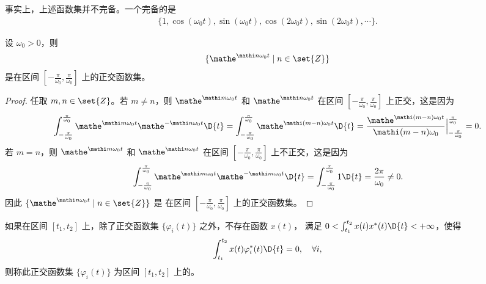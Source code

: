 \begin{note}
    事实上，上述函数集并不完备。一个完备的是
    \begin{align*}
        \{1, \cos(\omega_0t), \sin(\omega_0t), \cos(2\omega_0t), \sin(2\omega_0t), \cdots\}.
    \end{align*}
\end{note}

\begin{example}[指数函数集]
    设 $\omega_0 > 0$，则
    \begin{align*}
        \{\mathe^{\mathi n\omega_0t} \mid n \in \set{Z}\}
    \end{align*}
    是在区间 $[-\frac{\pi}{\omega_0}, \frac{\pi}{\omega_0}]$ 上的正交函数集。
\end{example}

\begin{proof}
    任取 $m, n \in \set{Z}$。若 $m \neq n$，则 $\mathe^{\mathi m\omega_0t}$ 和 $\mathe^{\mathi n\omega_0t}$
    在区间 $[-\frac{\pi}{\omega_0}, \frac{\pi}{\omega_0}]$ 上正交，这是因为
    \begin{align*}
        \int_{-\frac{\pi}{\omega_0}}^{\frac{\pi}{\omega_0}}\mathe^{\mathi m\omega_0t}\mathe^{-\mathi n\omega_0t}\D{t}
        = \int_{-\frac{\pi}{\omega_0}}^{\frac{\pi}{\omega_0}}\mathe^{\mathi (m - n)\omega_0t}\D{t}
        = \frac{\mathe^{\mathi (m - n)\omega_0t}}{\mathi (m - n)\omega_0}\Big|_{-\frac{\pi}{\omega_0}}^{\frac{\pi}{\omega_0}}
        = 0.
    \end{align*}
    若 $m = n$，则 $\mathe^{\mathi m\omega_0t}$ 和 $\mathe^{\mathi n\omega_0t}$
    在区间 $[-\frac{\pi}{\omega_0}, \frac{\pi}{\omega_0}]$ 上不正交，这是因为
    \begin{align*}
        \int_{-\frac{\pi}{\omega_0}}^{\frac{\pi}{\omega_0}}\mathe^{\mathi m\omega_0t}\mathe^{-\mathi m\omega_0t}\D{t}
        = \int_{-\frac{\pi}{\omega_0}}^{\frac{\pi}{\omega_0}}1\D{t}
        = \frac{2\pi}{\omega_0} \neq 0.
    \end{align*}
    因此 $\{\mathe^{\mathi n\omega_0t} \mid n \in \set{Z}\}$ 是
    在区间 $[-\frac{\pi}{\omega_0}, \frac{\pi}{\omega_0}]$ 上的正交函数集。
\end{proof}

\begin{definition}[完备的正交函数集]
    如果在区间 $[t_1, t_2]$ 上，除了正交函数集 $\{\varphi_i(t)\}$ 之外，不存在函数 $x(t)$，
    满足 $0 < \int_{t_1}^{t_2}x(t)x^*(t)\D{t} < +\infty$，使得
    \begin{align*}
        \int_{t_1}^{t_2}x(t)\varphi_i^*(t)\D{t} = 0, \quad \forall i,
    \end{align*}
    则称此正交函数集 $\{\varphi_i(t)\}$ 为区间 $[t_1, t_2]$ 上的。
\end{definition}

